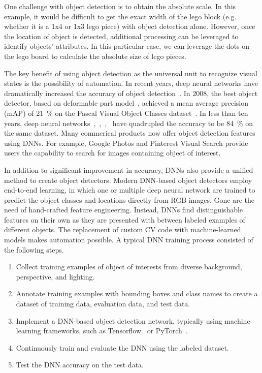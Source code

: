 One challenge with object detection is to obtain the absolute scale. In this
example, it would be difficult to get the exact width of the lego block (e.g.
whether it is a 1x4 or 1x3 lego piece) with object detection alone. However,
once the location of object is detected, additional processing can be leveraged
to identify objects' attributes. In this particular case, we can leverage the
dots on the lego board to calculate the absolute size of lego pieces.

The key benefit of using object detection as the universal unit to recognize
visual states is the possibility of automation. In recent years, deep neural
networks have dramatically increased the accuracy of object
detection~\cite{zou2019object}. In 2008, the best object detector, based on
deformable part model~\cite{felzenszwalb2008discriminatively}, achieved a mean
average precision (mAP) of 21~\% on the Pascal Visual Object Classes
dataset~\cite{everingham2010pascal}. In less than ten years, deep neural
networks~\cite{he2017mask},~\cite{Ren2015},~\cite{He2016},~\cite{lin2017focal}
have quadrupled the accuracy to be 84~\% on the same dataset. Many commerical
products now offer object detection features using DNNs. For example, Google
Photos and Pinterest Visual Search provide users the capability to search for
images containing object of interest.

In addition to significant improvement in accuracy, DNNs also provide a unified
method to create object detectors. Modern DNN-based object detectors employ
end-to-end learning, in which one or multiple deep neural network are trained to
predict the object classes and locations directly from RGB images. Gone are the
need of hand-crafted feature engineering. Instead, DNNs find distinguishable
features on their own as they are presented with between labeled examples of
different objects. The replacement of custom CV code with machine-learned models
makes automation possible. A typical DNN training process consisted of the
following steps.

\begin{enumerate}
  \item Collect training examples of object of interests from diverse
  background, perspective, and lighting.
  \item Annotate training examples with bounding boxes and class names to create
  a dataset of training data, evaluation data, and test data.
  \item Implement a DNN-based object detection network, typically using machine learning frameworks,
  such as Tensorflow~\cite{abadi2016tensorflow} or
  PyTorch~\cite{paszke2019pytorch}.
  \item Continuously train and evaluate the DNN using the labeled dataset.
  \item Test the DNN accuracy on the test data.
\end{enumerate}

